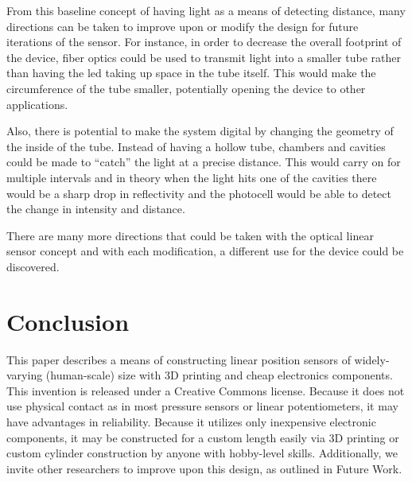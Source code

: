 \documentclass[10pt,conference,compsocconf]{IEEEtran}
\begin{document}
From this baseline concept of having light as a means of detecting distance, many directions can be taken to improve upon or modify the design for future iterations of the sensor. For instance, in order to decrease the overall footprint of the device, fiber optics could be used to transmit light into a smaller tube rather than having the led taking up space in the tube itself. This would make the circumference of the tube smaller, potentially opening the device to other applications. 

Also, there is potential to make the system digital by changing the geometry of the inside of the tube. Instead of having a hollow tube, chambers and cavities could be made to “catch” the light at a precise distance. This would carry on for multiple intervals and in theory when the light hits one of the cavities there would be a sharp drop in reflectivity and the photocell would be able to detect the change in intensity and distance. 

There are many more directions that could be taken with the optical linear sensor concept and with each modification, a different use for the device could be discovered.


\section{Conclusion}

This paper describes a means of constructing linear position sensors of widely-varying (human-scale) size with 3D printing and cheap electronics components. This invention is released under a Creative Commons license. Because it does not use physical contact as in most pressure sensors or linear potentiometers, it may have advantages in reliability. Because it utilizes only inexpensive electronic components, it may be constructed for a custom length easily via 3D printing or custom cylinder construction by anyone with hobby-level skills. Additionally, we invite other researchers to improve upon this design, as outlined in Future Work.






%
%
\end{document}
